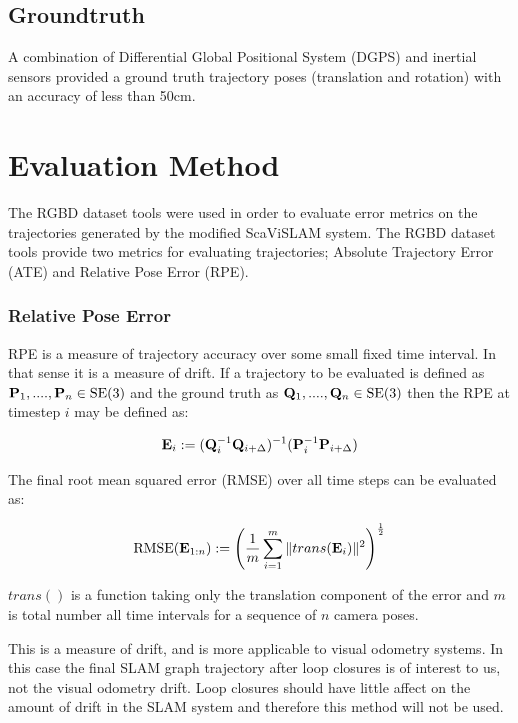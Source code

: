 \subsection{Groundtruth}

A combination of Differential Global Positional System (DGPS) and inertial sensors provided a ground truth trajectory poses (translation and rotation) with an accuracy of less than 50cm. 

\section{Evaluation Method}

The RGBD dataset tools\cite{sturm12iros} were used in order to evaluate error metrics on the trajectories generated by the modified ScaViSLAM system.  The RGBD dataset tools provide two metrics for evaluating trajectories; Absolute Trajectory Error (ATE) and Relative Pose Error (RPE).

\subsubsection{Relative Pose Error}

RPE is a measure of trajectory accuracy over some small fixed time interval.  In that sense it is a measure of drift.  If a trajectory to be evaluated is defined as $\mathbf P_1,....,\mathbf P_n \in \text{SE}(3)$ and the ground truth as $\mathbf Q_1,....,\mathbf Q_n \in \text{SE}(3)$ then the RPE at timestep $i$ may be defined as:

\begin{equation}
 \mathbf E_i := (\mathbf Q_i^{-1} \mathbf Q_{i+\Delta})^{-1}(\mathbf P_i^{-1} \mathbf P_{i+\Delta})
\end{equation}

The final root mean squared error (RMSE) over all time steps can be evaluated as:

\begin{equation}
 \text{RMSE}(\mathbf E_{1:n}) := \left( \dfrac{1}{m}\displaystyle\sum\limits_{i=1}^m \| trans(\mathbf E_i) \| ^2 \right)^\frac{1}{2}
 \label{eq:rmse}
\end{equation}

$trans()$ is a function taking only the translation component of the error and $m$ is total number all time intervals for a sequence of $n$ camera poses. 

This is a measure of drift, and is more applicable to visual odometry systems.  In this case the final SLAM graph trajectory after loop closures is of interest to us, not the visual odometry drift.  Loop closures should have little affect on the amount of drift in the SLAM system and therefore this method will not be used.


